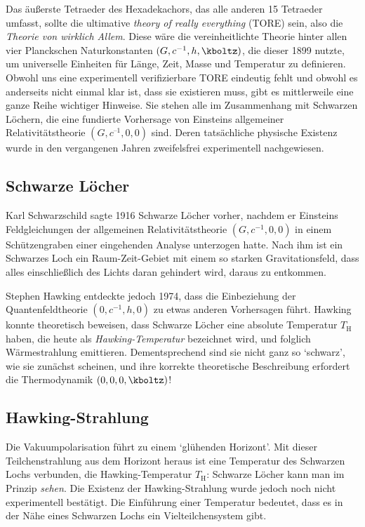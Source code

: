 
\newpage {}
\label{sec:1111}

Das äußerste Tetraeder des Hexadekachors, das alle anderen 15 Tetraeder umfasst, sollte die ultimative \emph{theory of really everything} (TORE) sein, also die \emph{Theorie von wirklich Allem}. Diese wäre die vereinheitlichte Theorie hinter allen vier Planckschen Naturkonstanten $(G,c^{-1},h,\kboltz)$, die dieser 1899 nutzte, um universelle Einheiten für Länge, Zeit, Masse und Temperatur zu definieren. Obwohl uns eine experimentell verifizierbare TORE eindeutig fehlt und obwohl es anderseits nicht einmal klar ist, dass sie existieren muss, gibt es mittlerweile eine ganze Reihe wichtiger Hinweise. Sie stehen alle im Zusammenhang mit Schwarzen Löchern, die eine fundierte Vorhersage von Einsteins allgemeiner Relativitätstheorie $(G, c^{–1}, 0, 0)$ sind. Deren tatsächliche physische Existenz wurde in den vergangenen Jahren zweifelsfrei experimentell nachgewiesen.


\subsection*{Schwarze Löcher}

Karl Schwarzschild sagte 1916 Schwarze Löcher vorher, nachdem er Einsteins Feldgleichungen der allgemeinen Relativitätstheorie $(G,c^{-1},0,0)$ in einem Schützengraben einer eingehenden Analyse unterzogen hatte. Nach ihm ist ein Schwarzes Loch ein Raum-Zeit-Gebiet mit einem so starken Gravitationsfeld, dass alles einschließlich des Lichts daran gehindert wird, daraus zu entkommen.

Stephen Hawking entdeckte jedoch 1974, dass die Einbeziehung der Quantenfeldtheorie $(0,c^{-1},h,0)$ zu etwas anderen Vorhersagen führt. Hawking konnte theoretisch beweisen, dass Schwarze Löcher eine absolute Temperatur $T_\mathrm{H}$ haben, die heute als \emph{Hawking-Temperatur} bezeichnet wird, und folglich Wärmestrahlung emittieren. Dementsprechend sind sie nicht ganz so \enquote*{schwarz}, wie sie zunächst scheinen, und ihre korrekte theoretische Beschreibung erfordert die Thermodynamik $(0,0,0,\kboltz)$!


\subsection*{Hawking-Strahlung}

Die Vakuumpolarisation führt zu einem \enquote*{glühenden Horizont}. Mit dieser Teilchenstrahlung aus dem Horizont heraus ist eine Temperatur des Schwarzen Lochs verbunden, die Hawking-Temperatur $T_{\text{H}}$: Schwarze Löcher kann man im Prinzip \emph{sehen}. Die Existenz der Hawking-Strahlung wurde jedoch noch nicht experimentell bestätigt. Die Einführung einer Temperatur bedeutet, dass es in der Nähe eines Schwarzen Lochs ein Vielteilchensystem gibt.


